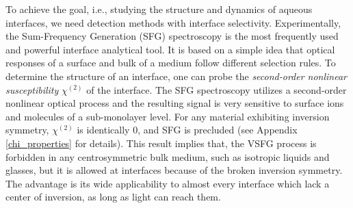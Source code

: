 To achieve the goal, i.e., studying the structure and dynamics of aqueous interfaces, we need detection methods with interface selectivity. 
Experimentally, the Sum-Frequency Generation (SFG) spectroscopy is the most frequently used and powerful interface  analytical tool\cite{Shen2016,Morita2018,Shen2020}.
It is based on a simple idea that optical responses of a surface and bulk of a medium follow different selection rules.
To determine the structure of an interface, one can probe the \emph{second-order nonlinear susceptibility} $\chi^{(2)}$ of 
the interface\cite{Shen84,Guyot-Sionnest1986,Shen2020}.
The SFG spectroscopy utilizes a second-order nonlinear optical process and the resulting signal is very sensitive to surface ions and 
molecules of a sub-monolayer level\cite{Morita2008,WangHongFei2015,WenYuChieh2016,Ishiyama2017,Penalber-Johnstone2018}. 
%
For any material exhibiting inversion symmetry, $\chi^{(2)}$ is identically 0, and SFG is precluded\cite{Franken1963} (see Appendix \ref{chi_properties} for details).
This result implies that, the VSFG process is forbidden in any centrosymmetric bulk medium\cite{Che2012},
such as isotropic liquids and glasses, but it is allowed at interfaces because of the broken inversion symmetry\cite{PF00}.
The advantage is its wide applicability to almost every interface which lack a center of inversion, as long as light can reach them. 

%


